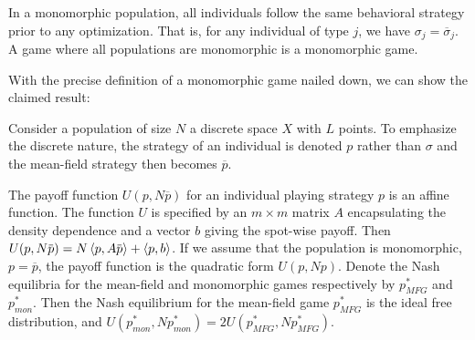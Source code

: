 \begin{definition}
  In a monomorphic population, all individuals follow the same behavioral strategy prior to any optimization. That is, for any individual of type $j$, we have $\sigma_j = \overbar{\sigma}_j$. A game where all populations are monomorphic is a monomorphic game.
\end{definition}
With the precise definition of a monomorphic game nailed down, we can show the claimed result:
\begin{proposition}
  \label{prop:doubleup}

  Consider a population of size $N$ a discrete space $X$ with $L$ points. To emphasize the discrete nature, the strategy of an individual is denoted $p$ rather than $\sigma$ and the mean-field strategy then becomes $\overbar{p}$.

  The payoff function $U(p,N\overbar{p})$ for an individual playing strategy $p$ is an affine function. The function $U$ is specified by an $m\times m$ matrix $A$ encapsulating the density dependence and a vector $b$ giving the spot-wise payoff. Then $U(p,N\overbar{p}) = N\ip{p}{A \overbar{p}} + \ip{p}{b}$. If we assume that the population is monomorphic, $p = \overbar{p}$, the payoff function is the quadratic form $U(p,N p)$. Denote the Nash equilibria for the mean-field and monomorphic games respectively by $p^*_{MFG}$ and $p^*_{mon}$. Then the Nash equilibrium for the mean-field game $p^*_{MFG}$ is the ideal free distribution, and $U(p^*_{mon}, N p^*_{mon}) = 2U(p^*_{MFG},N p^*_{MFG})$.
\end{proposition}

